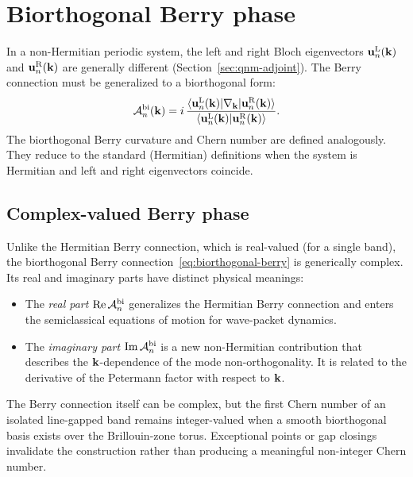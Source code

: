 \section{Biorthogonal Berry phase}
\label{sec:biorthogonal-berry}

In a non-Hermitian periodic system, the left and right Bloch eigenvectors
$\mathbf{u}_n^{\mathrm{L}}(\mathbf{k})$ and $\mathbf{u}_n^{\mathrm{R}}(\mathbf{k})$
are generally different (Section~\ref{sec:qnm-adjoint}). The Berry
connection must be generalized to a biorthogonal form:
\begin{equation}
 \mathcal{A}_n^{\mathrm{bi}}(\mathbf{k})
 = i\,\frac{\langle\mathbf{u}_n^{\mathrm{L}}(\mathbf{k})|\nabla_{\mathbf{k}}|
 \mathbf{u}_n^{\mathrm{R}}(\mathbf{k})\rangle}
 {\langle\mathbf{u}_n^{\mathrm{L}}(\mathbf{k})|\mathbf{u}_n^{\mathrm{R}}(\mathbf{k})\rangle}.
 \label{eq:biorthogonal-berry}
\end{equation}
The biorthogonal Berry curvature and Chern number are defined analogously.
They reduce to the standard (Hermitian) definitions when the system is
Hermitian and left and right eigenvectors coincide.

\subsection{Complex-valued Berry phase}
\label{ssec:complex-berry}

Unlike the Hermitian Berry connection, which is real-valued (for a
single band), the biorthogonal Berry connection~\eqref{eq:biorthogonal-berry}
is generically complex. Its real and imaginary parts have distinct
physical meanings:
\begin{itemize}
 \item The \emph{real part} $\operatorname{Re}\mathcal{A}_n^{\mathrm{bi}}$ generalizes the
 Hermitian Berry connection and enters the semiclassical equations of
 motion for wave-packet dynamics.
 \item The \emph{imaginary part} $\operatorname{Im}\mathcal{A}_n^{\mathrm{bi}}$ is a new
 non-Hermitian contribution that describes the $\mathbf{k}$-dependence of the
 mode non-orthogonality. It is related to the derivative of the
 Petermann factor with respect to $\mathbf{k}$.
\end{itemize}

The Berry connection itself can be complex, but the first Chern number
of an isolated line-gapped band remains integer-valued when a smooth
biorthogonal basis exists over the Brillouin-zone torus. Exceptional
points or gap closings invalidate the construction rather than producing
a meaningful non-integer Chern number.

